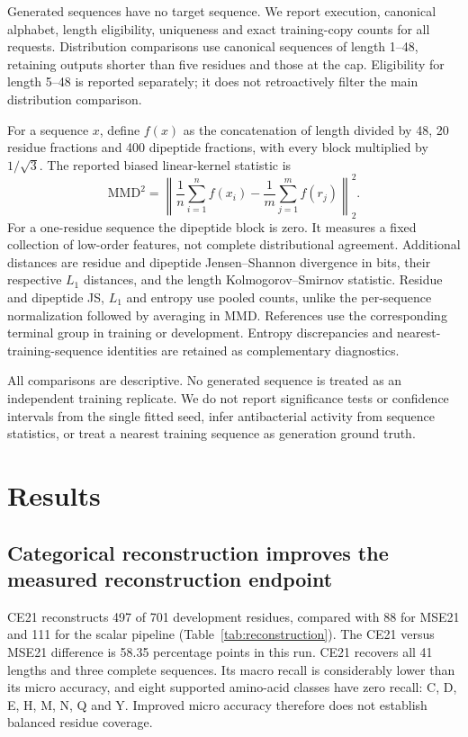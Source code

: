 \documentclass[12pt,a4paper]{article}
\newcommand{\mmd}{\mathrm{MMD}^{2}}
\begin{document}
Generated sequences have no target sequence. We report execution, canonical alphabet, length eligibility, uniqueness and exact training-copy counts for all requests. Distribution comparisons use canonical sequences of length 1--48, retaining outputs shorter than five residues and those at the cap. Eligibility for length 5--48 is reported separately; it does not retroactively filter the main distribution comparison.

For a sequence $x$, define $f(x)$ as the concatenation of length divided by 48, 20 residue fractions and 400 dipeptide fractions, with every block multiplied by $1/\sqrt{3}$. The reported biased linear-kernel statistic is
\begin{equation}
 \mmd=\left\|\frac{1}{n}\sum_{i=1}^n f(x_i)-\frac{1}{m}\sum_{j=1}^m f(r_j)\right\|_2^2.
\end{equation}
For a one-residue sequence the dipeptide block is zero. It measures a fixed collection of low-order features, not complete distributional agreement. Additional distances are residue and dipeptide Jensen--Shannon divergence in bits, their respective $L_1$ distances, and the length Kolmogorov--Smirnov statistic. Residue and dipeptide JS, $L_1$ and entropy use pooled counts, unlike the per-sequence normalization followed by averaging in MMD. References use the corresponding terminal group in training or development. Entropy discrepancies and nearest-training-sequence identities are retained as complementary diagnostics.

All comparisons are descriptive. No generated sequence is treated as an independent training replicate. We do not report significance tests or confidence intervals from the single fitted seed, infer antibacterial activity from sequence statistics, or treat a nearest training sequence as generation ground truth.

\section{Results}
\subsection{Categorical reconstruction improves the measured reconstruction endpoint}
CE21 reconstructs 497 of 701 development residues, compared with 88 for MSE21 and 111 for the scalar pipeline (Table~\ref{tab:reconstruction}). The CE21 versus MSE21 difference is 58.35 percentage points in this run. CE21 recovers all 41 lengths and three complete sequences. Its macro recall is considerably lower than its micro accuracy, and eight supported amino-acid classes have zero recall: C, D, E, H, M, N, Q and Y. Improved micro accuracy therefore does not establish balanced residue coverage.
\end{document}
